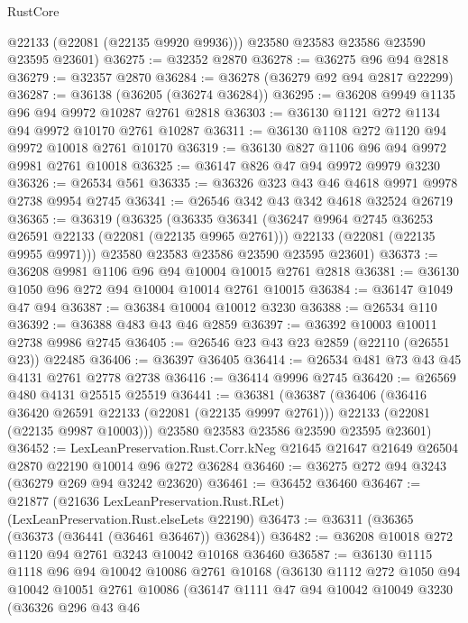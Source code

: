 \begin{lexlean}{RustCore}
\begin{coremodule}
        @22133
        (@22081 (@22135 @9920 @9936)))
      @23580
      @23583
      @23586
      @23590
      @23595
      @23601)
@36275 := @32352 @2870
@36278 := @36275 @96 @94 @2818
@36279 := @32357 @2870
@36284 := @36278 (@36279 @92 @94 @2817 @22299)
@36287 := @36138 (@36205 (@36274 @36284))
@36295 := @36208 @9949 @1135 @96 @94 @9972 @10287 @2761 @2818
@36303 := @36130 @1121 @272 @1134 @94 @9972 @10170 @2761 @10287
@36311 := @36130 @1108 @272 @1120 @94 @9972 @10018 @2761 @10170
@36319 := @36130 @827 @1106 @96 @94 @9972 @9981 @2761 @10018
@36325 := @36147 @826 @47 @94 @9972 @9979 @3230
@36326 := @26534 @561
@36335 := @36326 @323 @43 @46 @4618 @9971 @9978 @2738 @9954 @2745
@36341 := @26546 @342 @43 @342 @4618 @32524 @26719
@36365 := @36319
    (@36325
      (@36335
        @36341
        (@36247 @9964 @2745 @36253 @26591 @22133 (@22081 (@22135 @9965 @2761)))
        @22133
        (@22081 (@22135 @9955 @9971)))
      @23580
      @23583
      @23586
      @23590
      @23595
      @23601)
@36373 := @36208 @9981 @1106 @96 @94 @10004 @10015 @2761 @2818
@36381 := @36130 @1050 @96 @272 @94 @10004 @10014 @2761 @10015
@36384 := @36147 @1049 @47 @94
@36387 := @36384 @10004 @10012 @3230
@36388 := @26534 @110
@36392 := @36388 @483 @43 @46 @2859
@36397 := @36392 @10003 @10011 @2738 @9986 @2745
@36405 := @26546 @23 @43 @23 @2859 (@22110 (@26551 @23)) @22485
@36406 := @36397 @36405
@36414 := @26534 @481 @73 @43 @45 @4131 @2761 @2778 @2738
@36416 := @36414 @9996 @2745
@36420 := @26569 @480 @4131 @25515 @25519
@36441 := @36381
    (@36387
      (@36406
        (@36416 @36420 @26591 @22133 (@22081 (@22135 @9997 @2761)))
        @22133
        (@22081 (@22135 @9987 @10003)))
      @23580
      @23583
      @23586
      @23590
      @23595
      @23601)
@36452 := LexLeanPreservation.Rust.Corr.kNeg
    @21645
    @21647
    @21649
    @26504
    @2870
    @22190
    @10014
    @96
    @272
    @36284
@36460 := @36275 @272 @94 @3243 (@36279 @269 @94 @3242 @23620)
@36461 := @36452 @36460
@36467 := @21877 (@21636 LexLeanPreservation.Rust.RLet) (LexLeanPreservation.Rust.elseLets @22190)
@36473 := @36311 (@36365 (@36373 (@36441 (@36461 @36467)) @36284))
@36482 := @36208 @10018 @272 @1120 @94 @2761 @3243 @10042 @10168 @36460
@36587 := @36130
    @1115
    @1118
    @96
    @94
    @10042
    @10086
    @2761
    @10168
    (@36130
      @1112
      @272
      @1050
      @94
      @10042
      @10051
      @2761
      @10086
      (@36147
        @1111
        @47
        @94
        @10042
        @10049
        @3230
        (@36326
          @296
          @43
          @46

\end{coremodule}
\end{lexlean}
